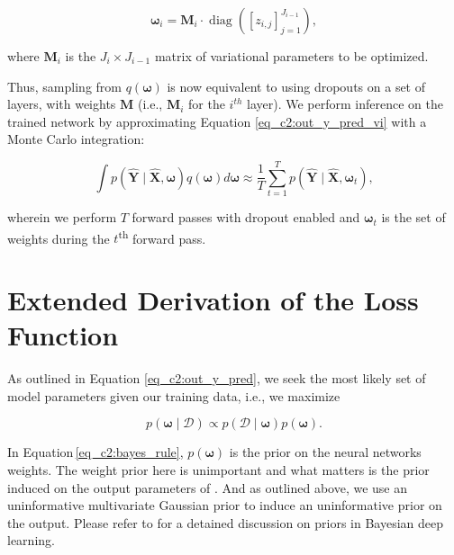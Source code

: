 \begin{equation}
\boldsymbol{\omega}_{i} =\boldsymbol{M}_{i} \cdot \operatorname{diag}\left(\left[z_{i, j}\right]_{j=1}^{J_{i-1}}\right) ,
\label{eq_c2:bernoulli}
\end{equation}

\noindent
where $\boldsymbol{M}_i$ is the $J_i \times J_{i-1}$ matrix of variational parameters to be optimized. 

Thus, sampling from $q(\boldsymbol{\omega})$ is now equivalent to using dropouts on a set of layers, with weights $\boldsymbol{M}$ %
(i.e., $\boldsymbol{M}_i$ for the $i^{th}$ layer). 
We perform inference on the trained network by 
approximating Equation \ref{eq_c2:out_y_pred_vi} with a Monte Carlo integration: 

\begin{equation}
\int p(\boldsymbol{\hat{Y}} \mid \boldsymbol{\hat{X}}, \boldsymbol{\omega}) q(\boldsymbol{\omega}) d \boldsymbol{\omega} \approx \frac{1}{T} \sum_{t=1}^{T} p(\boldsymbol{\hat{Y}} \mid \boldsymbol{\hat{X}}, \boldsymbol{\omega}_t) ,
\end{equation}

\noindent
wherein we perform $T$ forward passes with dropout enabled and $\boldsymbol{\omega}_t$ is the set of weights during the $t$\textsuperscript{th} forward pass.

\section{Extended Derivation of the Loss Function} \label{sec_c2:ap:final_loss_deri}


As outlined in Equation \ref{eq_c2:out_y_pred}, we seek the most likely set of model parameters given our training data, %
i.e., we maximize 

\begin{equation}
p(\boldsymbol{\omega} \mid \mathcal{D}) \propto p(\mathcal{D} \mid \boldsymbol{\omega})p(\boldsymbol{\omega}) .
\label{eq_c2:bayes_rule}
\end{equation}

In Equation\,\ref{eq_c2:bayes_rule}, $p(\boldsymbol{\omega})$ is the prior on the neural networks weights. The weight prior here is unimportant and what matters is the prior induced on the output parameters of \gampen{}. And as outlined above, we use an uninformative multivariate Gaussian prior to induce an uninformative prior on the output. Please refer to \cite{wilson_20} for a detained discussion on priors in Bayesian deep learning. 

